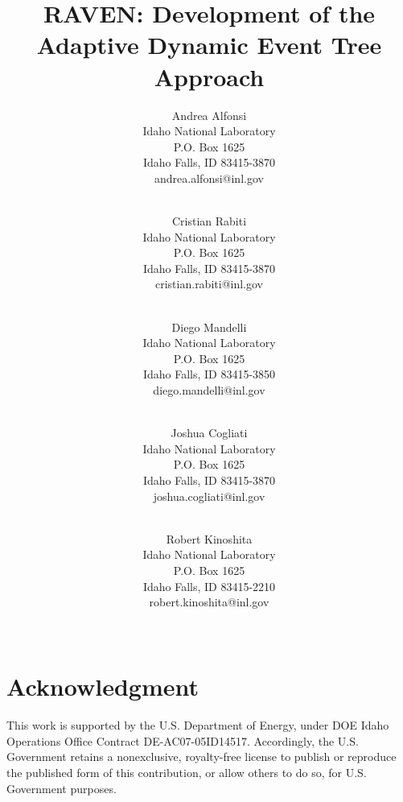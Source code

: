 \documentclass[pdf,ps2pdf,12pt]{INLreport}
\title{RAVEN: Development of the Adaptive Dynamic Event Tree Approach}
\author{Andrea Alfonsi \\
	  Idaho National Laboratory\\
	  P.O. Box 1625\\
	  Idaho Falls, ID 83415-3870\\
	  andrea.alfonsi@inl.gov\\
	  \\
	  \and
         Cristian Rabiti \\
	  Idaho National Laboratory\\
	  P.O. Box 1625\\
	  Idaho Falls, ID 83415-3870\\
	  cristian.rabiti@inl.gov\\
	  \\
	  \and
         Diego Mandelli \\
	  Idaho National Laboratory\\
	  P.O. Box 1625\\
	  Idaho Falls, ID 83415-3850\\
	  diego.mandelli@inl.gov\\
	  \\
	  \and
         Joshua Cogliati \\
	  Idaho National Laboratory\\
	  P.O. Box 1625\\
	  Idaho Falls, ID 83415-3870\\
	  joshua.cogliati@inl.gov\\
	  \\
	  \and
         Robert Kinoshita \\
	  Idaho National Laboratory\\
	  P.O. Box 1625\\
	  Idaho Falls, ID 83415-2210\\
	  robert.kinoshita@inl.gov\\
	  \\
	 }
\date{}
\begin{document}
    \maketitle

%      


    \clearpage
    \section*{Acknowledgment}
	This work is supported by the U.S. Department of Energy, under DOE Idaho Operations Office Contract DE-AC07-05ID14517. Accordingly, the U.S. Government retains a nonexclusive, royalty-free license to publish or reproduce the published form of this contribution, or allow others to do so, for U.S. Government purposes.
%


    \cleardoublepage		%
    \tableofcontents
    \listoffigures


\end{document}
